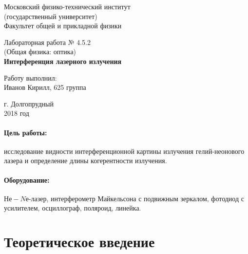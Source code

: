 \documentclass[12pt]{kiarticle} %
\begin{document}
	
	\begin{titlepage}
	\begin{center}
		\large 	Московский физико-технический институт \\
		(государственный университет) \\
		Факультет общей и прикладной физики \\
		\vspace{0.2cm}
		
		\vspace{4.5cm}
		Лабораторная работа № 4.5.2 \\ \vspace{0.2cm}
		\large (Общая физика: оптика) \\ \vspace{0.2cm}
		\LARGE \textbf{Интерференция лазерного излучения}
	\end{center}
	\vspace{2.3cm} \large
	
	\begin{center}
		Работу выполнил: \\
		Иванов Кирилл,
		625 группа
		\vspace{10mm}		
		
	\end{center}
	
	\begin{center} \vspace{60mm}
		г. Долгопрудный \\
		2018 год
	\end{center}
\end{titlepage}
	
	\paragraph*{Цель работы:} исследование видности интерференционной картины излучения гелий-неонового лазера и определение длины когерентности излучения.
	
	\paragraph*{Оборудование:}  $Не-Nе$-лазер, интерферометр Майкельсона с подвижным зеркалом, фотодиод с усилителем, осциллограф, поляроид, линейка.
	
	\section{Теоретическое введение}
	
\end{document}
